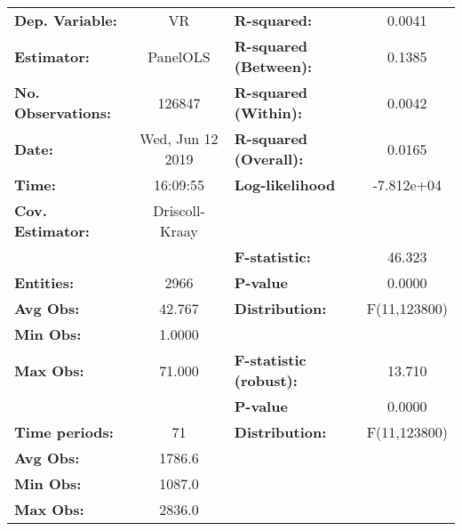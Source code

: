 \begin{center}
\begin{tabular}{lclc}
\toprule
\textbf{Dep. Variable:}                 &         VR         & \textbf{  R-squared:         }   &      0.0041      \\
\textbf{Estimator:}                     &      PanelOLS      & \textbf{  R-squared (Between):}  &      0.1385      \\
\textbf{No. Observations:}              &       126847       & \textbf{  R-squared (Within):}   &      0.0042      \\
\textbf{Date:}                          &  Wed, Jun 12 2019  & \textbf{  R-squared (Overall):}  &      0.0165      \\
\textbf{Time:}                          &      16:09:55      & \textbf{  Log-likelihood     }   &    -7.812e+04    \\
\textbf{Cov. Estimator:}                &   Driscoll-Kraay   & \textbf{                     }   &                  \\
\textbf{}                               &                    & \textbf{  F-statistic:       }   &      46.323      \\
\textbf{Entities:}                      &        2966        & \textbf{  P-value            }   &      0.0000      \\
\textbf{Avg Obs:}                       &       42.767       & \textbf{  Distribution:      }   &   F(11,123800)   \\
\textbf{Min Obs:}                       &       1.0000       & \textbf{                     }   &                  \\
\textbf{Max Obs:}                       &       71.000       & \textbf{  F-statistic (robust):} &      13.710      \\
\textbf{}                               &                    & \textbf{  P-value            }   &      0.0000      \\
\textbf{Time periods:}                  &         71         & \textbf{  Distribution:      }   &   F(11,123800)   \\
\textbf{Avg Obs:}                       &       1786.6       & \textbf{                     }   &                  \\
\textbf{Min Obs:}                       &       1087.0       & \textbf{                     }   &                  \\
\textbf{Max Obs:}                       &       2836.0       & \textbf{                     }   &                  \\

\end{tabular}
\end{center}
